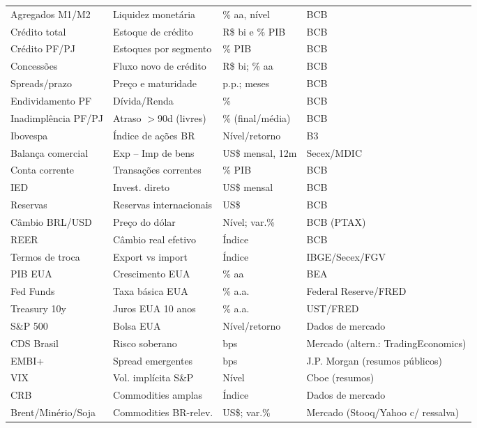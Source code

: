 \documentclass[11pt,a4paper]{article}
\begin{document}
\begin{longtable}{p{4.1cm} p{6.8cm} p{3.2cm} p{3.6cm}}
Agregados M1/M2 & Liquidez monetária & \% aa, nível & BCB \\
Crédito total & Estoque de crédito & R\$ bi e \% PIB & BCB \\
Crédito PF/PJ & Estoques por segmento & \% PIB & BCB \\
Concessões & Fluxo novo de crédito & R\$ bi; \% aa & BCB \\
Spreads/prazo & Preço e maturidade & p.p.; meses & BCB \\
Endividamento PF & Dívida/Renda & \% & BCB \\
Inadimplência PF/PJ & Atraso $>$90d (livres) & \% (final/média) & BCB \\
Ibovespa & Índice de ações BR & Nível/retorno & B3 \\
Balança comercial & Exp -- Imp de bens & US\$ mensal, 12m & Secex/MDIC \\
Conta corrente & Transações correntes & \% PIB & BCB \\
IED & Invest. direto & US\$ mensal & BCB \\
Reservas & Reservas internacionais & US\$ & BCB \\
Câmbio BRL/USD & Preço do dólar & Nível; var.\% & BCB (PTAX) \\
REER & Câmbio real efetivo & Índice & BCB \\
Termos de troca & Export vs import & Índice & IBGE/Secex/FGV \\
PIB EUA & Crescimento EUA & \% aa & BEA \\
Fed Funds & Taxa básica EUA & \% a.a. & Federal Reserve/FRED \\
Treasury 10y & Juros EUA 10 anos & \% a.a. & UST/FRED \\
S\&P 500 & Bolsa EUA & Nível/retorno & Dados de mercado \\
CDS Brasil & Risco soberano & bps & Mercado (altern.: TradingEconomics) \\
EMBI+ & Spread emergentes & bps & J.P. Morgan (resumos públicos) \\
VIX & Vol. implícita S\&P & Nível & Cboe (resumos) \\
CRB & Commodities amplas & Índice & Dados de mercado \\
Brent/Minério/Soja & Commodities BR-relev. & US\$; var.\% & Mercado (Stooq/Yahoo c/ ressalva) \\
\bottomrule
\end{longtable}
\end{document}
